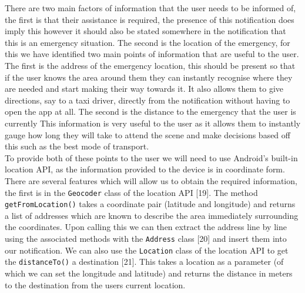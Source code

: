 \documentclass{article}
\begin{document}
There are two main factors of information that the user needs to be informed of, the first is that their assistance is required, the presence of this notification does imply this however it should also be stated somewhere in the notification that this is an emergency situation. The second is the location of the emergency, for this we have identified two main points of information that are useful to the user. The first is the address of the emergency location, this should be present so that if the user knows the area around them they can instantly recognise where they are needed and start making their way towards it. It also allows them to give directions, say to a taxi driver, directly from the notification without having to open the app at all. The second is the distance to the emergency that the user is currently This information is very useful to the user as it allows them to instantly gauge how long they will take to attend the scene and make decisions based off this such as the best mode of transport.\\

To provide both of these points to the user we will need to use Android’s built-in location API, as the information provided to the device is in coordinate form. There are several features which will allow us to obtain the required information, the first is in the \texttt{\color{OliveGreen}Geocoder} class of the location API [19]. The method \texttt{\color{OliveGreen}getFromLocation()} takes a coordinate pair (latitude and longitude) and returns a list of addresses which are known to describe the area immediately surrounding the coordinates. Upon calling this we can then extract the address line by line using the associated methods with the \texttt{\color{OliveGreen}Address} class [20] and insert them into our notification. We can also use the \texttt{\color{OliveGreen}Location} class of the location API to get the \texttt{\color{OliveGreen}distanceTo()} a destination [21]. This takes a location as a parameter (of which we can set the longitude and latitude) and returns the distance in meters to the destination from the users current location.\\
\end{document}
